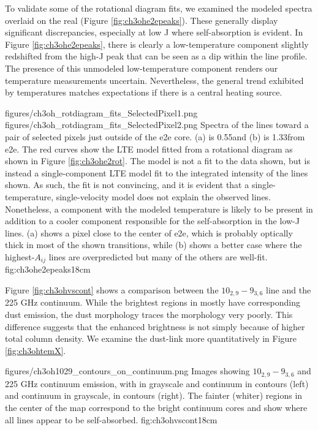 \documentclass{aa}
\begin{document}
To validate some of the rotational diagram fits, we examined the modeled
spectra overlaid on the real (Figure \ref{fig:ch3ohe2epeaks}).  These generally
display significant discrepancies, especially at low J where self-absorption is
evident.  In Figure \ref{fig:ch3ohe2epeaks}, there is clearly a low-temperature
component slightly redshifted from the high-J peak that can be seen as a dip
within the line profile.  The presence of this unmodeled low-temperature
component renders our \methanol temperature measurements uncertain.  Nevertheless,
the general trend exhibited by \methanol temperatures matches expectations
if there is a central heating source.



\FigureTwo
{figures/ch3oh_rotdiagram_fits_SelectedPixel1.png}
{figures/ch3oh_rotdiagram_fits_SelectedPixel2.png}
{Spectra of the \methanol lines toward a pair of selected pixels just outside
of the e2e core. (a) is 0.55\arcsec  and (b) is 1.33\arcsec from e2e.  The red
curves show the LTE model fitted from a rotational diagram as shown in Figure
\ref{fig:ch3ohe2rot}.  The model is not a fit to the data shown, but is instead
a single-component LTE model fit to the integrated intensity of the lines
shown.  As such, the fit is not convincing, and it is evident that a
single-temperature, single-velocity model does not explain the observed lines.
Nonetheless, a component with the modeled temperature is likely to be present
in addition to a cooler component responsible for the self-absorption in the
low-J lines.  (a) shows a pixel close to the center of e2e, which is probably
optically thick in most of the shown transitions, while (b) shows a better case
where the highest-$A_{ij}$ lines are overpredicted but many of the others are
well-fit.}
{fig:ch3ohe2epeaks}{1}{8cm}

Figure \ref{fig:ch3ohvscont} shows a comparison between the \methanol
$10_{2,9}-9_{3,6}$ line and the 225 GHz continuum.  While the brightest regions
in \methanol mostly have corresponding dust emission, the dust morphology
traces the \methanol morphology very poorly.  This difference suggests that the
enhanced brightness is not simply because of higher total column density.
We examine the dust-\methanol link more quantitatively in Figure
\ref{fig:ch3ohtemX}.

          {figures/ch3oh1029_contours_on_continuum.png}
{Images showing \methanol $10_{2,9}-9_{3,6}$ and 225 GHz continuum emission,
with \methanol in grayscale and continuum in contours (left) and continuum in
grayscale, \methanol in contours (right).  The fainter (whiter) regions in the center
of the \methanol map correspond to the bright continuum cores and show where all lines
appear to be self-absorbed.}
{fig:ch3ohvscont}{1}{8cm}
\end{document}
